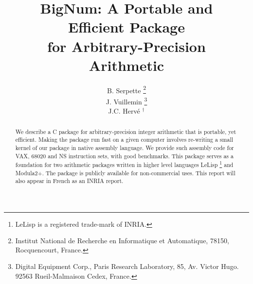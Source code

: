 

\title{{\Huge BigNum:  A Portable and \\ Efficient Package \\ for
Arbitrary-Precision \\ Arithmetic}}
\author{ B. Serpette  \thanks{Institut National de Recherche
          en Informatique et Automatique, 78150, Rocquencourt, France.} \\
        J. Vuillemin \thanks{Digital Equipment Corp., Paris Research Laboratory,
        85, Av. Victor Hugo.        92563 Rueil-Malmaison Cedex, France.}  \\
        J.C. Herv\'e  $^{\dagger}$  \\
       }  

\newtheorem{func}{Procedure}
\newcommand{\mod}{\bmod}
\newcommand{\lelisp}{LeLisp }
\newcommand{\ob}{\, _{b}[}
\newcommand{\N}{\mbox{{\bf N}}}
\newcommand{\n}{\mbox{{\verb+N+}}}
\newcommand{\m}{\mbox{{\verb+M+}}}
\newcommand{\p}{\mbox{{\verb+P+}}}
\newcommand{\q}{\mbox{{\verb+Q+}}}
\newcommand{\r}{\mbox{{\verb+R+}}}
\newcommand{\dd}{\mbox{{\verb+D+}}}
\newcommand{\bb}{\mbox{{\bf b}}}
\newcommand{\Z}{\mbox{{\bf Z}}}
\newcommand{\Bd}{\mbox{\bf B}_{2}}
\newcommand{\Bb}{\mbox{\bf B}_{b}}
\newcommand{\Nd}{\mbox{\bf N}_{2}}
\newcommand{\V}{{\cal V}}
\newcommand{\ips}[1]{\dotfill\ {\it #1}}

\makeindex

              
\maketitle                 %
\begin{abstract}
We describe a C package for arbitrary-precision integer
arithmetic that is portable, yet efficient. Making the package run fast
on a given computer involves re-writing a small
kernel of our package in native assembly language. 
We provide such assembly code for VAX, 68020 and NS instruction sets,
with good benchmarks. This package serves as a foundation for
two arithmetic packages written in higher level
languages \lelisp \footnote{\lelisp is a registered
trade-mark of INRIA.} and Modula2+. The package is publicly available for
non-commercial uses.
This report will also appear in French as an INRIA report.
\end{abstract}

